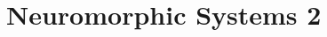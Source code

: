 \documentclass[main]{subfiles}
\begin{document}
\newpage
\section{Neuromorphic Systems 2} \label{l12}
\end{document}
